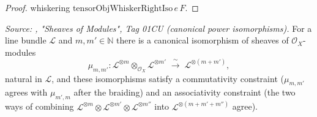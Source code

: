 \begin{proof}
  whiskering \(\mathrm{tensorObjWhiskerRightIso}\,e\,F\).
\end{proof}


\begin{lemma}\label{mk-lem:sheafTensorPow_add}
  \leanok

  \textit{Source: \cite{stacks-project}, "Sheaves of Modules", Tag 01CU (canonical
  power isomorphisms).}
  For a line bundle \(\mathcal{L}\) and \(m, m' \in \mathbb{N}\) there is a
  canonical isomorphism of sheaves of \(\mathcal{O}_X\)-modules
  \[
    \mu_{m,m'} :
    \mathcal{L}^{\otimes m} \otimes_{\mathcal{O}_X} \mathcal{L}^{\otimes m'}
    \;\xrightarrow{\ \sim\ }\; \mathcal{L}^{\otimes (m+m')},
  \]
  natural in \(\mathcal{L}\), and these isomorphisms satisfy a commutativity
  constraint (\(\mu_{m,m'}\) agrees with \(\mu_{m',m}\) after the braiding) and
  an associativity constraint (the two ways of combining
  \(\mathcal{L}^{\otimes m} \otimes \mathcal{L}^{\otimes m'} \otimes
  \mathcal{L}^{\otimes m''}\) into \(\mathcal{L}^{\otimes (m+m'+m'')}\) agree).
\end{lemma}

